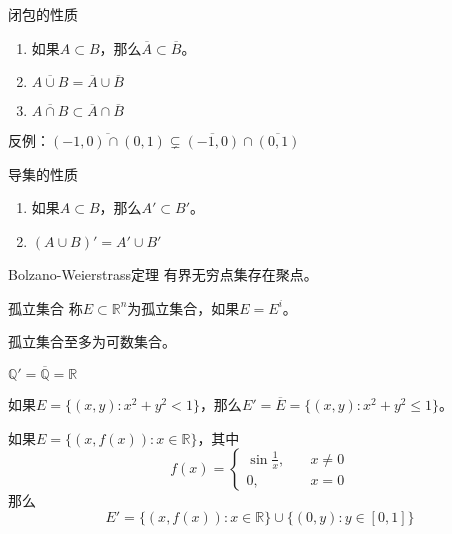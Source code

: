 \documentclass[lang = cn, scheme = chinese, thmcnt = section]{elegantbook}
\newcommand{\R}{\mathbb{R}}            %
\newcommand{\Q}{\mathbb{Q}}            %
\newcommand{\sub}{\subset}             %
\begin{document}
\begin{proposition}{闭包的性质}
	\begin{enumerate}
		\item 如果$A\sub B$，那么$\overline{A}\sub \overline{B}$。
		\item $\overline{A\cup B}=\overline{A}\cup \overline{B}$
		\item $\overline{A\cap B}\sub\overline{A}\cap \overline{B}$
	\end{enumerate}
\end{proposition}

\begin{note}
	反例：$\overline{(-1,0)\cap (0,1)}\subsetneq\overline{(-1,0)}\cap \overline{(0,1)}$
\end{note}

\begin{proposition}{导集的性质}
	\begin{enumerate}
		\item 如果$A\sub B$，那么$A'\sub B'$。
		\item $(A\cup B)'=A'\cup B'$
	\end{enumerate}
\end{proposition}

\begin{theorem}{Bolzano-Weierstrass定理}
	有界无穷点集存在聚点。
\end{theorem}

\begin{definition}{孤立集合}
	称$E\sub\R^n$为孤立集合，如果$E=E^i$。
\end{definition}

\begin{theorem}
	孤立集合至多为可数集合。
\end{theorem}

\begin{exercise}
	$\Q'=\overline{\Q}=\R$
\end{exercise}

\begin{exercise}
	如果$E=\{ (x,y):x^2+y^2<1 \}$，那么$E'=\overline{E}=\{ (x,y):x^2+y^2\le1 \}$。
\end{exercise}

\begin{exercise}
	如果$E=\{ (x,f(x)):x\in\R \}$，其中%
	$$
	f(x)=\begin{cases}
		\sin\frac{1}{x},\quad & x\ne0\\
		0,\quad & x=0
	\end{cases}
	$$
	那么%
	$$
	E'=\{ (x,f(x)):x\in\R \}\cup\{ (0,y):y\in[0,1] \}
	$$
\end{exercise}
\end{document}
